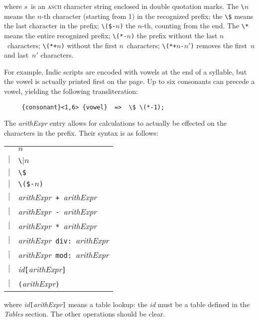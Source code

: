 \documentclass[fleqn]{article}
\begin{document}
\noindent
where $s$~is an \textsc{ascii} character string enclosed in double
quotation marks.
The \verb|\|$n$ means the $n$-th character (starting from 1)
in the recognized prefix; the \verb|\$| means the last character in the 
prefix; \verb|\($-|$n$\verb|)| the $n$-th, counting from the end.
The \verb|\*| means the entire recognized prefix;
\verb|\(*-|$n$\verb|)| the prefix without the last $n$~characters;
\verb|\(*+|$n$\verb|)| without the first $n$~characters;
\verb|\(*+|$n$\verb|-|$n'$\verb|)| removes the first~$n$ and last~$n'$
characters.

For example, Indic scripts are encoded with vowels at the end of a
syllable, but the vowel is actually printed first on the page.  Up
to six consonants can precede a vowel, yielding the following
transliteration:
\begin{verbatim}
     {consonant}<1,6> {vowel}  =>  \$ \(*-1);
\end{verbatim}

The \emph{arithExpr} entry allows for calculations to actually be
effected on the characters in the prefix. Their syntax is as follows:

\begin{tabular}{ll}
 & $n$\\
$\mid$ & \verb|\|$n$\\
$\mid$ & \verb|\$|\\
$\mid$ & \verb|\($-|$n$\verb|)|\\
$\mid$ & \emph{arithExpr}\verb| + |\emph{arithExpr}\\
$\mid$ & \emph{arithExpr}\verb| - |\emph{arithExpr}\\
$\mid$ & \emph{arithExpr}\verb| * |\emph{arithExpr}\\
$\mid$ & \emph{arithExpr}\verb| div: |\emph{arithExpr}\\
$\mid$ & \emph{arithExpr}\verb| mod: |\emph{arithExpr}\\
$\mid$ & \emph{id}\verb|[|\emph{arithExpr}\verb|]|\\
$\mid$ & \verb|(|\emph{arithExpr}\verb|)|\\
\end{tabular}

\noindent
where \emph{id}\verb|[|\emph{arithExpr}\verb|]| means a table lookup:
the \emph{id} must be a table defined in the \emph{Tables} section.
The other operations should be clear.
\end{document}
